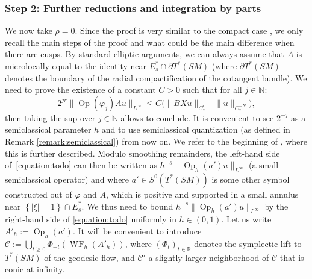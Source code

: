 \documentclass[JEP,XML,SOM,Unicode,NoFloatCountersInSection]{cedram}
\newcommand{\R}{\mathbb{R}}
\newcommand{\N}{\mathbb{N}}
\newcommand{\mc}{\mathcal}
\DeclareMathOperator{\Op}{Op}
\DeclareMathOperator{\WF}{WF}
\theoremstyle{plain}
\theoremstyle{definition}
\begin{document}
\subsubsection*{Step 2: Further reductions and integration by parts} We now take $\rho=0$. Since the proof is very similar to the compact case \cite{Bonthonneau-Lefeuvre-21}, we only recall the main steps of the proof and what could be the main difference when there are cusps. By standard elliptic arguments, we can always assume that $A$ is microlocally equal to the identity near $E_s^* \cap \partial T^*(SM)$ (where $\partial T^*(SM)$ denotes the boundary of the radial compactification of the cotangent bundle). We need to prove the existence of a constant $C > 0$ such that for all $j \in \N$:
\begin{equation}
\label{equation:todo}
2^{jr} \|\Op(\varphi_j) A u \|_{L^\infty} \leq C \bigl( \|BX u\|_{C^r_*} + \|u\|_{C^{-N}_*}\bigr),
\end{equation}
then taking the sup over $j \in \N$ allows to conclude. It is convenient to see $2^{-j}$ as a semiclassical parameter $h$ and to use semiclassical quantization (as defined in Remark \ref{remark:semiclassical}) from now on. We refer to the beginning of \cite[Proof of Th.\,3.2]{Bonthonneau-Lefeuvre-21}, where this is further described. Modulo smoothing remainders, the left-hand side of~\eqref{equation:todo} can then be written as $h^{-s}\|\Op_h(a')u\|_{L^\infty}$ (a small semiclassical operator) and where $a' \in S^0(T^*(SM))$ is some other symbol constructed out of $\varphi$ and $A$, which is positive and supported in a small annulus near $\left\{|\xi|=1\right\} \cap E_s^*$. We thus need to bound $h^{-s} \|\Op_h(a')u\|_{L^\infty}$ by the right-hand side of \eqref{equation:todo} uniformly in $h \in (0,1)$. Let us write $A'_h := \Op_h(a')$. It will be convenient to introduce $\mc{C} := \bigcup_{t \geq 0} \Phi_{-t}(\WF_h(A'_h))$, where $(\Phi_t)_{t \in \R}$ denotes the symplectic lift to $T^*(SM)$ of the geodesic flow, and $\mc{C}'$ a slightly larger neighborhood of $\mc{C}$ that is conic at infinity.
\end{document}
